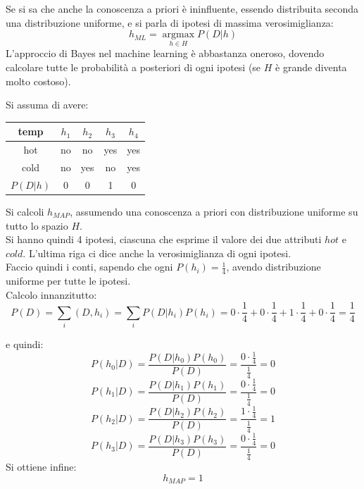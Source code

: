 \documentclass[a4paper,12pt, oneside]{book}
\begin{document}
Se si sa che anche la conoscenza a priori è ininfluente, essendo distribuita
seconda una distribuzione uniforme, e si parla di ipotesi di massima
verosimiglianza:
\[h_{ML}=\operatorname*{argmax}_{h\in H}P(D|h)\]
L'approccio di Bayes nel machine learning è abbastanza oneroso, dovendo
calcolare tutte le probabilità a posteriori di ogni ipotesi (se $H$ è grande
diventa molto costoso).
\begin{esercizio}
  Si assuma di avere:
  \begin{table}[H]
    \centering
    \begin{tabular}{c||c|c|c|c}
      temp & $h_1$ & $h_2$ & $h_3$ & $h_4$\\
      \hline
      \hline
      hot & no & no & yes & yes\\
      cold & no &yes & no & yes \\
      \hline
      \hline
      $P(D|h)$ & 0 & 0 & 1 &0
    \end{tabular}
  \end{table}
  Si calcoli $h_{MAP}$, assumendo una conoscenza a priori con distribuzione
  uniforme su tutto lo spazio $H$.\\
  Si hanno quindi 4 ipotesi, ciascuna che esprime il valore dei due attributi
  $hot $ e $cold$. L'ultima riga ci dice anche la verosimiglianza di ogni
  ipotesi.\\
  Faccio quindi i conti, sapendo che ogni $P(h_i)=\frac{1}{4}$, avendo
  distribuzione uniforme per tutte le ipotesi.\\
  Calcolo innanzitutto:
  \[P(D)=\sum_i(D, h_i)=\sum_i
    P(D|h_i)P(h_i)=0\cdot\frac{1}{4}+0\cdot\frac{1}{4}+
    1\cdot\frac{1}{4}+0\cdot\frac{1}{4}=\frac{1}{4}\]
  
  e quindi:
  \[P(h_0|D)=\frac{P(D|h_0)P(h_0)}{P(D)}=
    \frac{0\cdot\frac{1}{4}}{\frac{1}{4}}=0\]
  \[P(h_1|D)=\frac{P(D|h_1)P(h_1)}{P(D)}=
    \frac{0\cdot\frac{1}{4}}{\frac{1}{4}}=0\]
  \[P(h_2|D)=\frac{P(D|h_2)P(h_2)}{P(D)}=
    \frac{1\cdot\frac{1}{4}}{\frac{1}{4}}=1\]
  \[P(h_3|D)=\frac{P(D|h_3)P(h_3)}{P(D)}=
    \frac{0\cdot\frac{1}{4}}{\frac{1}{4}}=0\]
  Si ottiene infine:
  \[h_{MAP}=1\]
\end{esercizio}
\end{document}
